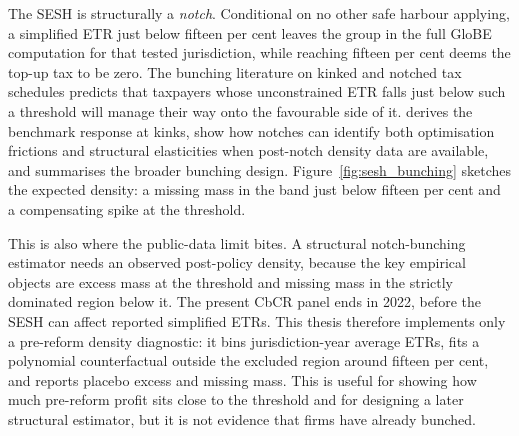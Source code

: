 \documentclass[11pt,a4paper]{article}
\begin{document}
The SESH is structurally a \emph{notch}. Conditional on no other safe harbour applying, a simplified ETR just below fifteen per cent leaves the group in the full GloBE computation for that tested jurisdiction, while reaching fifteen per cent deems the top-up tax to be zero. The bunching literature on kinked and notched tax schedules predicts that taxpayers whose unconstrained ETR falls just below such a threshold will manage their way onto the favourable side of it. \citet{saez2010} derives the benchmark response at kinks, \citet{kleven2013} show how notches can identify both optimisation frictions and structural elasticities when post-notch density data are available, and \citet{kleven2016} summarises the broader bunching design. Figure~\ref{fig:sesh_bunching} sketches the expected density: a missing mass in the band just below fifteen per cent and a compensating spike at the threshold.

This is also where the public-data limit bites. A structural notch-bunching estimator needs an observed post-policy density, because the key empirical objects are excess mass at the threshold and missing mass in the strictly dominated region below it. The present CbCR panel ends in 2022, before the SESH can affect reported simplified ETRs. This thesis therefore implements only a pre-reform density diagnostic: it bins jurisdiction-year average ETRs, fits a polynomial counterfactual outside the excluded region around fifteen per cent, and reports placebo excess and missing mass. This is useful for showing how much pre-reform profit sits close to the threshold and for designing a later structural estimator, but it is not evidence that firms have already bunched.
\end{document}
